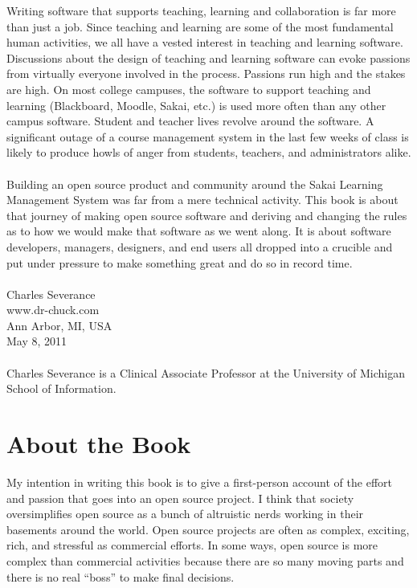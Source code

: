 \documentclass[12pt]{book}
\begin{document}
Writing software that supports teaching, learning and collaboration is
far more than just a job.  Since teaching and learning are some of
the most fundamental human activities, we all have a vested interest
in teaching and learning software.  Discussions about the design of
teaching and learning software can evoke passions from virtually
everyone involved in the process.   Passions run high and the
stakes are high.  On most college campuses, the software to
support teaching and learning (Blackboard, Moodle, Sakai, etc.)
is used more often than any other campus software.   Student and
teacher lives revolve around the software.  A significant outage
of a course management system in the last few weeks of class is
likely to produce howls of anger from students, teachers,
and administrators alike.\\
 \\
Building an open source product and community around the Sakai
Learning Management System was far from a mere technical activity.
This book is about that journey of
making open source software
and deriving and changing the rules as to how we would make that
software as we went along.  It is about software developers,
managers, designers, and end users all dropped into a crucible
and put under pressure to make something great and do so
in record time.\\
 \\
Charles Severance\\
www.dr-chuck.com\\
Ann Arbor, MI, USA\\
May 8, 2011\\
 \\
Charles Severance is a
Clinical Associate Professor
at the University of Michigan School of Information.

\section*{About the Book}

My intention in writing this book is to give a first-person
account of the effort and passion that goes into an open
source project. I think that society oversimplifies open
source as a bunch of altruistic nerds working in their basements
around the world.   Open source projects are
often as complex, exciting, rich, and stressful as commercial
efforts.  In some ways, open source is more complex
than commercial activities because there are so many moving
parts and there is no real ``boss'' to make final decisions.
\end{document}
